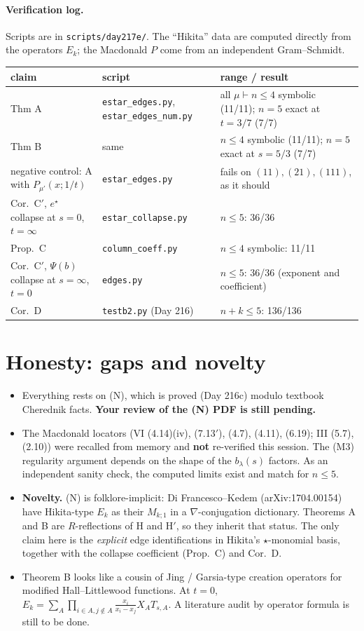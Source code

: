 \documentclass[11pt]{article}
\theoremstyle{definition}
\newcommand{\file}[1]{\nolinkurl{#1}}
\begin{document}
\paragraph{Verification log.} Scripts are in \file{scripts/day217e/}. The ``Hikita'' data are computed directly from the operators $E_k$; the Macdonald $P$ come from an independent Gram--Schmidt.
\begin{center}
\small
\begin{tabularx}{\textwidth}{@{}Y l Y@{}}
\toprule
claim & script & range / result\\
\midrule
Thm A & \file{estar_edges.py}, \file{estar_edges_num.py} & all $\mu\vdash n\le4$ symbolic (11/11); $n=5$ exact at $t=3/7$ (7/7)\\
Thm B & same & $n\le4$ symbolic (11/11); $n=5$ exact at $s=5/3$ (7/7)\\
negative control: A with $P_{\mu'}(x;1/t)$ & \file{estar_edges.py} & fails on $(11),(21),(111)$, as it should\\
Cor.~C$'$, $e^\star$ collapse at $s=0$, $t=\infty$ & \file{estar_collapse.py} & $n\le5$: 36/36\\
Prop.~C & \file{column_coeff.py} & $n\le4$ symbolic: 11/11\\
Cor.~C$'$, $\Psi(b)$ collapse at $s=\infty$, $t=0$ & \file{edges.py} & $n\le5$: 36/36 (exponent and coefficient)\\
Cor.~D & \file{testb2.py} (Day 216) & $n+k\le5$: 136/136\\
\bottomrule
\end{tabularx}
\end{center}

\section{Honesty: gaps and novelty}
\begin{itemize}
\item Everything rests on (N), which is proved (Day 216c) modulo textbook Cherednik facts. \textbf{Your review of the (N) PDF is still pending.}
\item The Macdonald locators (VI (4.14)(iv), (7.13$'$), (4.7), (4.11), (6.19); III (5.7), (2.10)) were recalled from memory and \textbf{not} re-verified this session. The (M3) regularity argument depends on the shape of the $b_\lambda(s)$ factors. As an independent sanity check, the computed limits exist and match for $n\le5$.
\item \textbf{Novelty.} (N) is folklore-implicit: Di Francesco--Kedem (arXiv:1704.00154) have Hikita-type $E_k$ as their $M_{k;1}$ in a $\nabla$-conjugation dictionary. Theorems A and B are $R$-reflections of H and H$'$, so they inherit that status. The only claim here is the \emph{explicit} edge identifications in Hikita's $\star$-monomial basis, together with the collapse coefficient (Prop.~C) and Cor.~D.
\item Theorem B looks like a cousin of Jing / Garsia-type creation operators for modified Hall--Littlewood functions. At $t=0$, $E_k=\sum_A\prod_{i\in A,j\notin A}\frac{x_i}{x_i-x_j}X_AT_{s,A}$. A literature audit by operator formula is still to be done.
\end{itemize}
\end{document}
